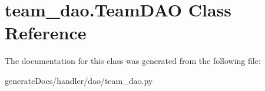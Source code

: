 \hypertarget{classteam__dao_1_1_team_d_a_o}{}\section{team\+\_\+dao.\+Team\+D\+AO Class Reference}
\label{classteam__dao_1_1_team_d_a_o}


The documentation for this class was generated from the following file\+:\begin{DoxyCompactItemize}
\item 
generate\+Docs/handler/dao/team\+\_\+dao.\+py\end{DoxyCompactItemize}
